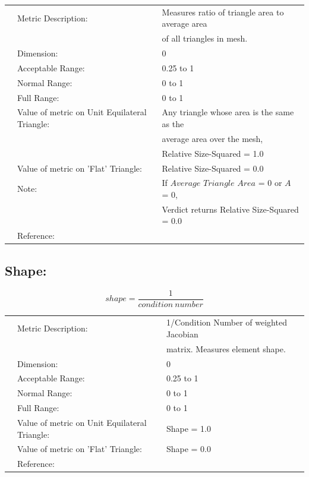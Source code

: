 \documentclass[12pt]{article}
\begin{document}
\begin{tabular}{lll}
& Metric Description:  & Measures ratio of triangle area to average area \\ 
&                      & of all triangles in mesh.             \\ 
& Dimension:           & 0                                          \\ 
& Acceptable Range:    & 0.25 to 1                                     \\ 
& Normal Range:        & 0 to 1                           \\ 
& Full Range:          & 0 to 1                           \\ 
& Value of metric on Unit Equilateral Triangle:   & Any triangle whose area is the same as the \\
&                      & average area over the mesh, \\
&                      & Relative Size-Squared = 1.0  \\
& Value of metric on 'Flat' Triangle:  & Relative Size-Squared = 0.0               \\ 
& Note:                & If $Average$ $Triangle$ $Area$ = 0 or $A$ = 0, \\ 
&                      & Verdict returns Relative Size-Squared = 0.0 \\
& Reference:           & \cite{five} \\ 
\end{tabular} 

\subsection*{Shape:}

\begin{displaymath}
shape = \frac { 1 } { condition~number }
\end{displaymath}

\begin{tabular}{lll}
& Metric Description:  & 1/Condition Number of weighted Jacobian \\
&                      & matrix. Measures element shape.   \\
& Dimension:           & 0                                          \\ 
& Acceptable Range:    & 0.25 to 1                                     \\ 
& Normal Range:        & 0 to 1                           \\ 
& Full Range:          & 0 to 1                           \\ 
& Value of metric on Unit Equilateral Triangle:       & Shape = 1.0 \\
& Value of metric on 'Flat' Triangle:  & Shape = 0.0  \\
& Reference:           & \cite{five} \\ 
\end{tabular} 
\end{document}
